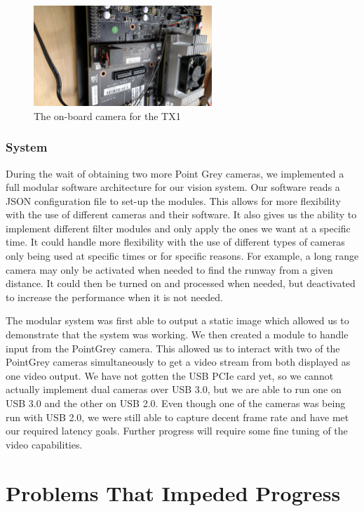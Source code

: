\documentclass[letterpaper,10pt,titlepage]{IEEEtran}
\begin{document}
\begin{figure}[!ht]
  \caption{The on-board camera for the TX1 }
	  \centering
		    \includegraphics[width=0.6\textwidth,natwidth=610,natheight=642]{images/rot-3.jpg}
				\end{figure}

   \subsubsection{System}
   During the wait of obtaining two more Point Grey cameras, we implemented a full modular software architecture for our vision system. Our software reads a JSON configuration file to set-up the modules. This allows for more flexibility with the use of different cameras and their software. It also gives us the ability to implement different filter modules and only apply the ones we want at a specific time. It could handle more flexibility with the use of different types of cameras only being used at specific times or for specific reasons. For example, a long range camera may only be activated when needed to find the runway from a given distance. It could then be turned on and processed when needed, but deactivated to increase the performance when it is not needed.\\ 
\par
The modular system was first able to output a static image which allowed us to demonstrate that the system was working. We then created a module to handle input from the PointGrey camera. This allowed us to interact with two of the PointGrey cameras simultaneously to get a video stream from both displayed as one video output. We have not gotten the USB PCIe card yet, so we cannot actually implement dual cameras over USB 3.0, but we are able to run one on USB 3.0 and the other on USB 2.0. Even though one of the cameras was being run with USB 2.0, we were still able to capture decent frame rate and have met our required latency goals. Further progress will require some fine tuning of the video capabilities.
   
   \section{Problems That Impeded Progress}
\end{document}
